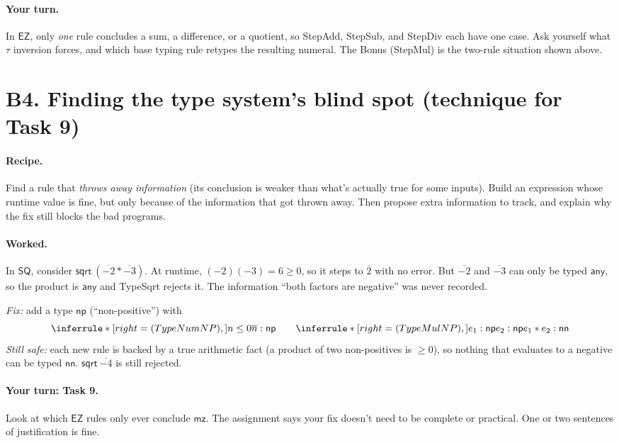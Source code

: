 \documentclass[11pt]{article}
\newcommand{\SQRT}[1]{\mathsf{sqrt}\ #1}
\newcommand{\NN}{\mathsf{nn}}
\newcommand{\ANY}{\mathsf{any}}
\newcommand{\NP}{\mathsf{np}}
\newcommand{\MZ}{\mathsf{mz}}
\newcommand{\num}[1]{\overline{#1}}
\begin{document}
\paragraph{Your turn.} In $\mathsf{EZ}$, only \emph{one} rule concludes a
sum, a difference, or a quotient, so StepAdd, StepSub, and StepDiv each have one
case. Ask yourself what $\tau$ inversion forces, and which base typing rule
retypes the resulting numeral. The Bonus (StepMul) is the two-rule situation
shown above.

\section*{B4. Finding the type system's blind spot \hfill (technique for Task 9)}

\paragraph{Recipe.} Find a rule that \emph{throws away information} (its
conclusion is weaker than what's actually true for some inputs). Build an
expression whose runtime value is fine, but only because of the information
that got thrown away. Then propose extra information to track, and explain
why the fix still blocks the bad programs.

\paragraph{Worked.} In $\mathsf{SQ}$, consider
$\SQRT{(\num{-2}*\num{-3})}$. At runtime, $(-2)(-3)=6\ge0$, so it steps to
$\num2$ with no error. But $\num{-2}$ and $\num{-3}$ can only be typed
$\ANY$, so the product is $\ANY$ and TypeSqrt rejects it. The information
``both factors are negative'' was never recorded.

\emph{Fix:} add a type $\NP$ (``non-positive'') with
\[
  \Rule{TypeNumNP}{n\le 0}{\num n:\NP}
  \qquad
  \Rule{TypeMulNP}{e_1:\NP \\ e_2:\NP}{e_1*e_2:\NN}
\]
\emph{Still safe:} each new rule is backed by a true arithmetic fact (a
product of two non-positives is $\ge 0$), so nothing that evaluates to a
negative can be typed $\NN$. $\SQRT{\num{-4}}$ is still rejected.

\paragraph{Your turn: Task 9.} Look at which $\mathsf{EZ}$ rules only ever
conclude $\MZ$. The assignment says your fix doesn't need to be complete or
practical. One or two sentences of justification is fine.
\end{document}

